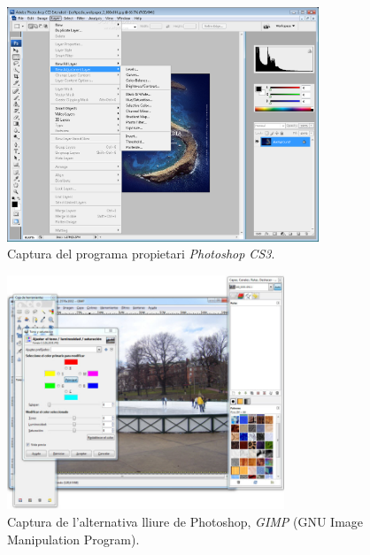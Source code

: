 \begin{figure}[ht!]
\centering
\includegraphics[height=70mm]{data/photoshop.png}
\caption{Captura del programa propietari \emph{Photoshop CS3}.}
\label{photoshop}
\end{figure}

\begin{figure}[ht!]
\centering
\includegraphics[height=70mm]{data/gimp.jpg}
\caption{Captura de l'alternativa lliure de Photoshop, \emph{GIMP} (GNU Image Manipulation Program).}
\label{gimp}
\end{figure}

